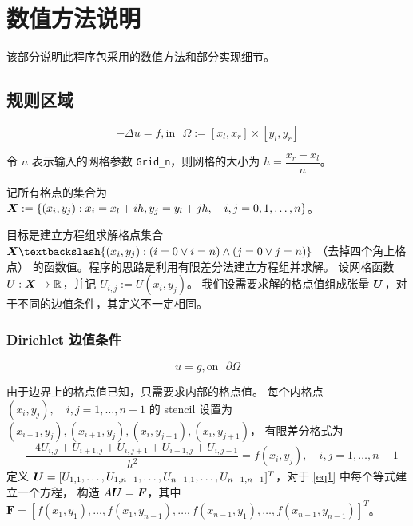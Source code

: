 \documentclass[lang=cn,a4paper,newtx,bibend=bibtex]{elegantpaper}
\begin{document}
\section{数值方法说明}

该部分说明此程序包采用的数值方法和部分实现细节。

\subsection{规则区域}

\[\boxed{- \Delta u = f, \text{in~~} \Omega := [x_l, x_r] \times [y_l, y_r]}\]

令 $n$ 表示输入的网格参数 \texttt{Grid\_n}，则网格的大小为 $h = \dfrac{x_r - x_l}{n}$。

记所有格点的集合为 $\bm{X} := \{(x_i, y_j): x_i = x_l + ih, y_j = y_l + jh,\quad  i, j = 0, 1, \dots, n\}$。

目标是建立方程组求解格点集合 $\XB \fxg \{(x_i, y_j) : (i = 0 \lor i = n) \land (j = 0 \lor j = n)\}$ （去掉四个角上格点）
的函数值。程序的思路是利用有限差分法建立方程组并求解。
设网格函数 $U:\bm{X} \to \mathbb{R}$，并记 $U_{i,j} := U(x_i, y_j)$。
我们设需要求解的格点值组成张量 $\bm{U}$，对于不同的边值条件，其定义不一定相同。

\subsubsection{Dirichlet 边值条件}\label{Dirichlet}

\[\boxed{u = g, \text{on~~} \partial \Omega}\]

由于边界上的格点值已知，只需要求内部的格点值。
每个内格点 $(x_i, y_j), \quad i, j = 1, \dots, n-1$ 的 
stencil 设置为 \((x_{i-1}, y_j), (x_{i+1}, y_j), (x_i, y_{j-1}), (x_i, y_{j+1})\)，
有限差分格式为
\begin{equation}
  - \dfrac{-4 U_{i, j} + U_{i+1, j} + U_{i, j+1} + U_{i-1,j} + U_{i, j-1}}{h^2} = f(x_i, y_j), \quad i, j = 1, \dots, n-1
  \label{eq1}
\end{equation}
定义 $\bm{U} = [U_{1,1}, \dots, U_{1, n-1},\dots, U_{n-1,1}, \dots, U_{n-1,n-1}]^T$，对于 \eqref{eq1} 中每个等式建立一个方程，
构造 $A\bm{U} = \bm{F}$，其中 $\bm{F} = [f(x_1,y_1), \dots, f(x_1, y_{n-1}),\dots, f(x_{n-1},y_1), \dots, f(x_{n-1},y_{n-1})]^T$。
\end{document}
